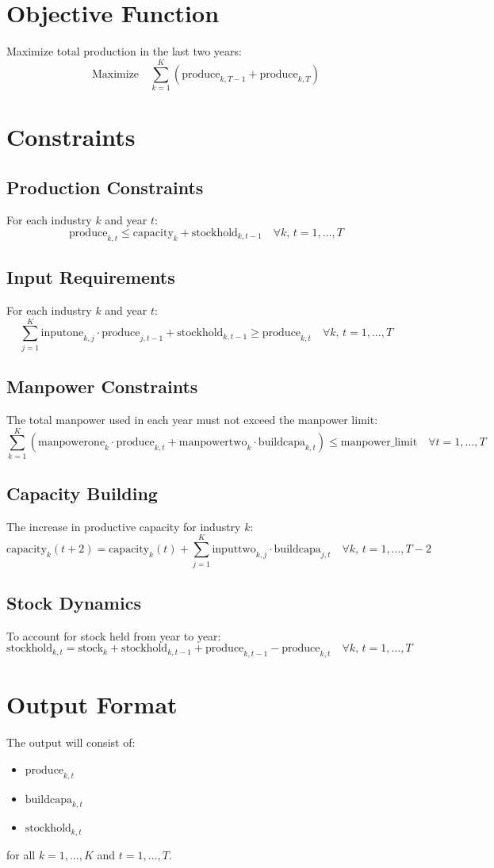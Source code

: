\documentclass{article}
\begin{document}
\section*{Objective Function}
Maximize total production in the last two years:
\[
\text{Maximize} \quad \sum_{k=1}^{K} \left( \text{produce}_{k,T-1} + \text{produce}_{k,T} \right)
\]

\section*{Constraints}

\subsection*{Production Constraints}
For each industry \( k \) and year \( t \):
\[
\text{produce}_{k,t} \leq \text{capacity}_{k} + \text{stockhold}_{k,t-1} \quad \forall k, \, t = 1, \ldots, T
\]

\subsection*{Input Requirements}
For each industry \( k \) and year \( t \):
\[
\sum_{j=1}^{K} \text{inputone}_{k,j} \cdot \text{produce}_{j,t-1} + \text{stockhold}_{k,t-1} \geq \text{produce}_{k,t} \quad \forall k, \, t = 1, \ldots, T
\]

\subsection*{Manpower Constraints}
The total manpower used in each year must not exceed the manpower limit:
\[
\sum_{k=1}^{K} \left( \text{manpowerone}_{k} \cdot \text{produce}_{k,t} + \text{manpowertwo}_{k} \cdot \text{buildcapa}_{k,t} \right) \leq \text{manpower\_limit} \quad \forall t = 1, \ldots, T
\]

\subsection*{Capacity Building}
The increase in productive capacity for industry \( k \):
\[
\text{capacity}_{k} (t+2) = \text{capacity}_{k}(t) + \sum_{j=1}^{K} \text{inputtwo}_{k,j} \cdot \text{buildcapa}_{j,t} \quad \forall k, \, t = 1, \ldots, T-2
\]

\subsection*{Stock Dynamics}
To account for stock held from year to year:
\[
\text{stockhold}_{k,t} = \text{stock}_{k} + \text{stockhold}_{k,t-1} + \text{produce}_{k,t-1} - \text{produce}_{k,t} \quad \forall k, \, t = 1, \ldots, T
\]

\section*{Output Format}
The output will consist of:
\begin{itemize}
    \item \( \text{produce}_{k,t} \)
    \item \( \text{buildcapa}_{k,t} \)
    \item \( \text{stockhold}_{k,t} \)
\end{itemize}
for all \( k = 1, \ldots, K \) and \( t = 1, \ldots, T \).
\end{document}
